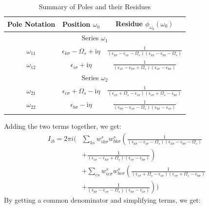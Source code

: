 \documentclass[12pt]{caltech_thesis}
\begin{document}
\begin{table}[h]
\centering
\caption{Summary of Poles and their Residues}
\begin{tabular}{|c|c|c|}
\hline
Pole Notation & Position $\omega_0$ & Residue $\phi_{\omega_0}(\omega_0)$ \\
\hline
\multicolumn{3}{|c|}{Series $\omega_1$} \\
\hline
$\omega_{11}$ & $\epsilon_{k \sigma} - \Omega_s + \mathrm{i} \eta$ & $\frac{1}{(\epsilon_{k \sigma} -\epsilon_{i \sigma}-\Omega_s)(\epsilon_{k \sigma} -\epsilon_{b \sigma}-\Omega_s)}$ \\
$\omega_{12}$ & $\epsilon_{i \sigma} + \mathrm{i} \eta$ & $\frac{1}{(\epsilon_{i \sigma} -\epsilon_{k \sigma}+\Omega_s)(\epsilon_{i \sigma} -\epsilon_{b \sigma})}$ \\
\hline
\multicolumn{3}{|c|}{Series $\omega_2$} \\
\hline
$\omega_{21}$ & $\epsilon_{c \sigma} + \Omega_s - \mathrm{i} \eta$ & $\frac{1}{(\epsilon_{c \sigma} + \Omega_s -\epsilon_{i \sigma})(\epsilon_{c \sigma} + \Omega_s -\epsilon_{b \sigma})}$ \\
$\omega_{22}$ & $\epsilon_{b \sigma} - \mathrm{i} \eta$ & $\frac{1}{(\epsilon_{b \sigma} -\epsilon_{c \sigma}-\Omega_s)(\epsilon_{b \sigma} -\epsilon_{i \sigma})}$ \\
\hline
\label{tab:poles_residues_mixed}
\end{tabular}
\end{table}
Adding the two terms together, we get:
\begin{equation}
\begin{aligned}
I_{ib} = 2\pi i \Bigg( & \sum_{ks} w_{i k \sigma}^s w_{b k \sigma}^s \left( \frac{1}{(\epsilon_{k \sigma} -\epsilon_{i \sigma}-\Omega_s)(\epsilon_{k \sigma} -\epsilon_{b \sigma}-\Omega_s)} \right. \\
& \left. + \frac{1}{(\epsilon_{i \sigma} -\epsilon_{k \sigma}+\Omega_s)(\epsilon_{i \sigma} -\epsilon_{b \sigma})} \right) \\
& + \sum_{cs} w_{i c \sigma}^s w_{b c \sigma}^s \left( \frac{1}{(\epsilon_{c \sigma} + \Omega_s -\epsilon_{i \sigma})(\epsilon_{c \sigma} + \Omega_s -\epsilon_{b \sigma})} \right. \\
& \left. + \frac{1}{(\epsilon_{b \sigma} -\epsilon_{c \sigma}-\Omega_s)(\epsilon_{b \sigma} -\epsilon_{i \sigma})} \right) \Bigg)
\end{aligned}
\end{equation}
By getting a common denominator and simplifying terms, we get:
\end{document}
